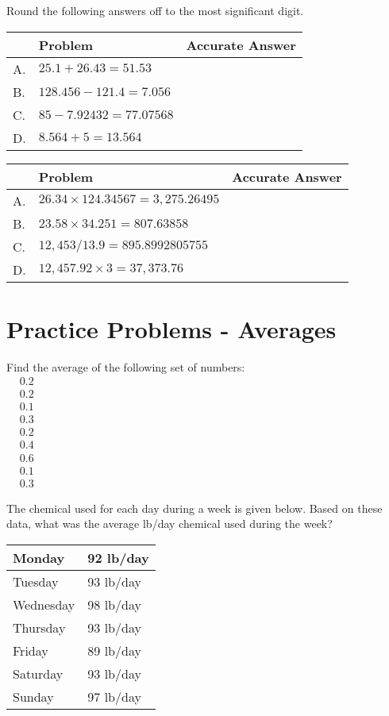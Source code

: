 \vspace{0.5cm}

Round the following answers off to the most significant digit.\\

\begin{tabular}{|l|l|l|}
\hline
 & Problem & Accurate Answer \\
\hline
A. & $25.1+26.43=51.53$ &  \\
\hline
B. & $128.456-121.4=7.056$ &  \\
\hline
C. & $85-7.92432=77.07568$ &  \\
\hline
D. & $8.564+5=13.564$ &  \\
\hline
\end{tabular}

\begin{tabular}{|l|l|l|}
\hline
 & Problem & Accurate Answer \\
\hline
A. & $26.34 \times 124.34567=3,275.26495$ &  \\
\hline
B. & $23.58 \times 34.251=807.63858$ &  \\
\hline
C. & $12,453 / 13.9=895.8992805755$ &  \\
\hline
D. & $12,457.92 \times 3=37,373.76$ &  \\
\hline
\end{tabular}

\section*{Practice Problems - Averages}


Find the average of the following set of numbers:\\
$
\begin{aligned}
&0.2 \\
&0.2 \\
&0.1 \\
&0.3 \\
&0.2 \\
&0.4 \\
&0.6 \\
&0.1 \\
&0.3
\end{aligned}
$

The chemical used for each day during a week is given below. Based on these data, what was the average lb/day chemical used during the week?\\

\begin{tabular}{|l|l|}
\hline
Monday & 92 lb/day\\
\hline
Tuesday & 93 lb/day \\
\hline
Wednesday & 98 lb/day\\
\hline
Thursday & 93 lb/day \\
\hline
Friday & 89 lb/day\\
\hline
Saturday & 93 lb/day \\
\hline
Sunday & 97 lb/day\\
\hline
\end{tabular}

